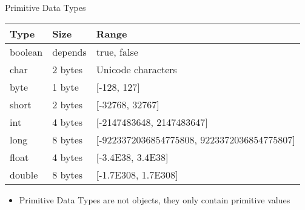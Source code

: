 \documentclass{beamer}
\begin{document}
\begin{frame}{Primitive Data Types}
\begin{table}[]
\begin{tabular}{|l|l|l|}
\hline
\textbf{Type} & \textbf{Size} & \textbf{Range}                                  \\ \hline
boolean       & depends       & true, false                                     \\ \hline
char          & 2 bytes       & Unicode characters                              \\ \hline
byte          & 1 byte        & {[}-128, 127{]}                                 \\ \hline
short         & 2 bytes       & {[}-32768, 32767{]}                             \\ \hline
int           & 4 bytes       & {[}-2147483648, 2147483647{]}                   \\ \hline
long          & 8 bytes       & {[}-9223372036854775808, 9223372036854775807{]} \\ \hline
float         & 4 bytes       & {[}-3.4E38, 3.4E38{]}                           \\ \hline
double        & 8 bytes       & {[}-1.7E308, 1.7E308{]}                         \\ \hline
\end{tabular}
\end{table}

\begin{itemize}
    \item Primitive Data Types are not objects, they only contain primitive values
\end{itemize}
\end{frame}
\end{document}
